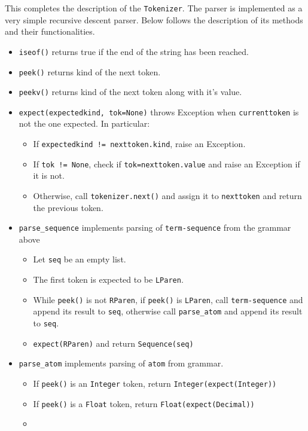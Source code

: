 This completes the description of the \texttt{Tokenizer}. The parser is implemented as a very simple recursive descent parser. Below follows the description of its methods and their functionalities.

\begin{itemize}
\item
\texttt{iseof()} returns true if the end of the string has been reached.

\item
\texttt{peek()} returns kind of the next token. 

\item
\texttt{peekv()} returns kind of the next token along with it's value.

\item 
\texttt{expect(expectedkind, tok=None)} throws Exception when \texttt{currenttoken} is not the one expected. In particular:
	\begin{itemize}
		\item
		If \texttt{expectedkind != nexttoken.kind}, raise an Exception.
		\item
		If \texttt{tok != None}, check if \texttt{tok=nexttoken.value} and raise an Exception if it is not.
		\item
		Otherwise, call \texttt{tokenizer.next()} and assign it to \texttt{nexttoken} and return the previous token. 
	\end{itemize}

\item 
	\texttt{parse\_sequence} implements parsing of \texttt{term-sequence} from the grammar above
	\begin{itemize}
		\item
		Let \texttt{seq} be an empty list.

		\item
		The first token is expected to be \texttt{LParen}.

		\item
		While \texttt{peek()} is not \texttt{RParen}, if \texttt{peek()} is \texttt{LParen}, call \texttt{term-sequence} and append its result to \texttt{seq}, otherwise call \texttt{parse\_atom} and append its result to \texttt{seq}.
	
		\item
		\texttt{expect(RParen)} and return \texttt{Sequence(seq)}
	\end{itemize}

\item
\texttt{parse\_atom} implements parsing of \texttt{atom} from grammar.
	\begin{itemize}
	\item
		If \texttt{peek()} is an \texttt{Integer} token, return \texttt{Integer(expect(Integer))}
	\item
		If \texttt{peek()} is a \texttt{Float} token, return \texttt{Float(expect(Decimal))}
	\item


\end{itemize}
\end{itemize}

